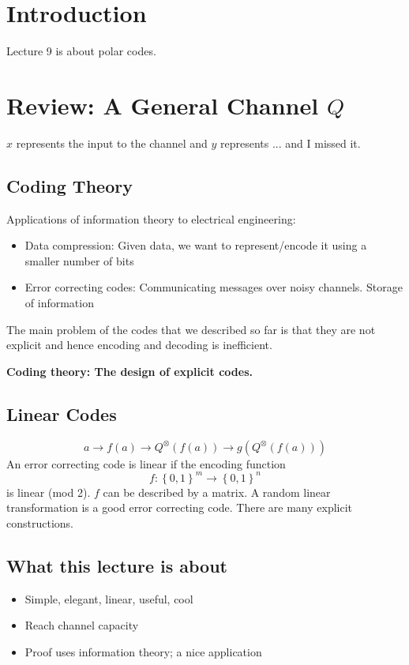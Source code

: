 \documentclass{article}
\begin{document}
\section{Introduction}

Lecture 9 is about polar codes.

\section{Review: A General Channel $Q$}

$x$ represents the input to the channel and $y$ represents ... and I missed it.

\subsection{Coding Theory}

Applications of information theory to electrical engineering:
\begin{itemize}
    \item Data compression: Given data, we want to represent/encode it using a smaller number of bits
    \item Error correcting codes: Communicating messages over noisy channels. Storage of information
\end{itemize}
The main problem of the codes that we described so far is that they are not explicit and hence encoding and decoding is inefficient.

\textbf{Coding theory: The design of explicit codes.}

\subsection{Linear Codes}
\[
a\to f(a) \to Q^\otimes (f(a)) \to g(Q^\otimes (f(a)))
\]
An error correcting code is linear if the encoding function 
\[
f:\left\{0,1\right\}^m\to \left\{0,1\right\}^n
\]
is linear (mod 2). $f$ can be described by a matrix. A random linear transformation is a good error correcting code. There are many explicit constructions.

\subsection{What this lecture is about}
\begin{itemize}
    \item Simple, elegant, linear, useful, cool
    \item Reach channel capacity
    \item Proof uses information theory; a nice application
\end{itemize}
\end{document}
